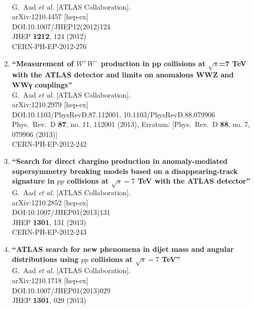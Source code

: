 \documentclass{article}
\begin{document}
\begin{enumerate}
  \\{}G.~Aad {\it et al.} [ATLAS Collaboration].
  \\{}arXiv:1210.4457 [hep-ex]
  \\{}DOI:10.1007/JHEP12(2012)124
  \\{}JHEP {\bf 1212}, 124 (2012)
  \\{}CERN-PH-EP-2012-276
\item%
{\bf ``Measurement of $W^+W^-$ production in pp collisions at $\sqrt{s}$=7  TeV with the ATLAS detector and limits on anomalous WWZ and WWγ couplings''}
  \\{}G.~Aad {\it et al.} [ATLAS Collaboration].
  \\{}arXiv:1210.2979 [hep-ex]
  \\{}DOI:10.1103/PhysRevD.87.112001, 10.1103/PhysRevD.88.079906
  \\{}Phys.\ Rev.\ D {\bf 87}, no. 11, 112001 (2013), Erratum: [Phys.\ Rev.\ D {\bf 88}, no. 7, 079906 (2013)]
  \\{}CERN-PH-EP-2012-242
\item%
{\bf ``Search for direct chargino production in anomaly-mediated supersymmetry breaking models based on a disappearing-track signature in $pp$ collisions at $\sqrt{s}=7$ TeV with the ATLAS detector''}
  \\{}G.~Aad {\it et al.} [ATLAS Collaboration].
  \\{}arXiv:1210.2852 [hep-ex]
  \\{}DOI:10.1007/JHEP01(2013)131
  \\{}JHEP {\bf 1301}, 131 (2013)
  \\{}CERN-PH-EP-2012-243
\item%
{\bf ``ATLAS search for new phenomena in dijet mass and angular distributions using $pp$ collisions at $\sqrt{s}=7$ TeV''}
  \\{}G.~Aad {\it et al.} [ATLAS Collaboration].
  \\{}arXiv:1210.1718 [hep-ex]
  \\{}DOI:10.1007/JHEP01(2013)029
  \\{}JHEP {\bf 1301}, 029 (2013)

\end{enumerate}
\end{document}
